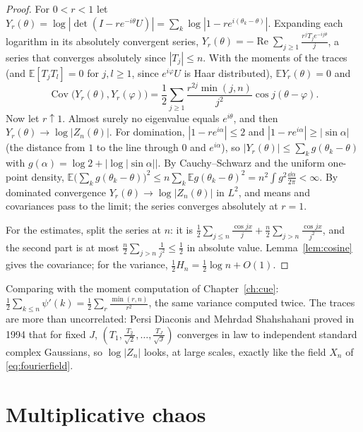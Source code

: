 \begin{proof}
For $0<r<1$ let $Y_r(\theta)=\log|\det(I-re^{-i\theta}U)|=\sum_k\log|1-re^{i(\theta_k-\theta)}|$. Expanding each logarithm in its absolutely convergent series, $Y_r(\theta)=-\operatorname{Re}\sum_{j\ge1}\frac{r^jT_je^{-ij\theta}}j$, a series that converges
absolutely since $|T_j|\le n$. With the moments of the traces (and $\mathbb E[T_jT_l]=0$ for $j,l\ge1$, since $e^{i\varphi}U$ is Haar distributed), $\mathbb EY_r(\theta)=0$ and
\[
\operatorname{Cov}\bigl(Y_r(\theta),Y_r(\varphi)\bigr)=\frac12\sum_{j\ge1}\frac{r^{2j}\min(j,n)}{j^2}\cos j(\theta-\varphi).
\]
Now let $r\uparrow1$. Almost surely no eigenvalue equals $e^{i\theta}$, and then $Y_r(\theta)\to\log|Z_n(\theta)|$. For domination, $|1-re^{i\alpha}|\le2$ and $|1-re^{i\alpha}|\ge|\sin\alpha|$ (the distance from $1$ to the line through $0$ and $e^{i\alpha}$), so
$|Y_r(\theta)|\le\sum_kg(\theta_k-\theta)$ with $g(\alpha)=\log2+|\log|\sin\alpha||$. By Cauchy--Schwarz and the uniform one-point density, $\mathbb E\bigl(\sum_kg(\theta_k-\theta)\bigr)^2\le n\sum_k\mathbb Eg(\theta_k-\theta)^2=n^2\int g^2\frac{\dd\alpha}{2\pi}<\infty$.
By dominated convergence $Y_r(\theta)\to\log|Z_n(\theta)|$ in $L^2$, and means and covariances pass to the limit; the series converges absolutely at $r=1$.

For the estimates, split the series at $n$: it is $\frac12\sum_{j\le n}\frac{\cos jx}j+\frac n2\sum_{j>n}\frac{\cos jx}{j^2}$, and the second part is at most $\frac n2\sum_{j>n}\frac1{j^2}\le\frac12$ in absolute value. Lemma~\ref{lem:cosine} gives the
covariance; for the variance, $\frac12H_n=\frac12\log n+O(1)$.
\end{proof}

Comparing with the moment computation of Chapter~\ref{ch:cue}: $\frac12\sum_{k\le n}\psi'(k)=\frac12\sum_{r}\frac{\min(r,n)}{r^2}$, the same variance computed twice. The traces are more than uncorrelated: Persi Diaconis and Mehrdad Shahshahani proved in 1994 that for
fixed $J$, $(T_1,\frac{T_2}{\sqrt2},\dots,\frac{T_J}{\sqrt J})$ converges in law to independent standard complex Gaussians, so $\log|Z_n|$ looks, at large scales, exactly like the field $X_n$ of \eqref{eq:fourierfield}.

\section{Multiplicative chaos}

